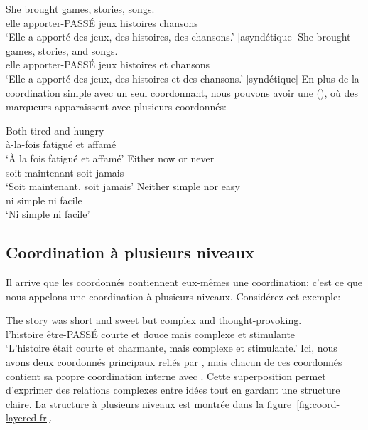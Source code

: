\ea \label{ex:coord-marking-fr}
    \ea \gll She brought {\ob}games{\cb}, {\ob}stories{\cb}, {\ob}songs{\cb}.\\
        elle apporter-PASSÉ jeux histoires chansons\\
    \glt `Elle a apporté des jeux, des histoires, des chansons.' [asyndétique]
    \ex \gll She brought {\ob}games{\cb}, {\ob}stories{\cb}, and {\ob}songs{\cb}.\\
        elle apporter-PASSÉ jeux histoires et chansons\\
    \glt `Elle a apporté des jeux, des histoires et des chansons.' [syndétique]
    \z
\z
En plus de la coordination simple avec un seul coordonnant, nous pouvons avoir une  (), où des marqueurs apparaissent avec plusieurs coordonnés:

\ea \label{ex:coord-correlative-fr}
    \ea \gll {\ob}Both{\cb} tired {\ob}and{\cb} hungry\\
        à-la-fois fatigué et affamé\\
    \glt `À la fois fatigué et affamé'
    \ex \gll {\ob}Either{\cb} now {\ob}or{\cb} never\\
        soit maintenant soit jamais\\
    \glt `Soit maintenant, soit jamais'
    \ex \gll {\ob}Neither{\cb} simple {\ob}nor{\cb} easy\\
        ni simple ni facile\\
    \glt `Ni simple ni facile'
    \z
\z

\subsection{Coordination à plusieurs niveaux}

Il arrive que les coordonnés contiennent eux-mêmes une coordination; c'est ce que nous appelons une coordination à plusieurs niveaux. Considérez cet exemple:

\ea \label{ex:coord-layered-fr}
\gll The story was {\ob}short and sweet{\cb} but {\ob}complex and thought-provoking{\cb}.\\
    l'histoire être-PASSÉ courte et douce mais complexe et stimulante\\
\glt `L'histoire était courte et charmante, mais complexe et stimulante.'
\z
Ici, nous avons deux coordonnés principaux reliés par , mais chacun de ces coordonnés contient sa propre coordination interne avec . Cette superposition permet d'exprimer des relations complexes entre idées tout en gardant une structure claire. La structure à plusieurs niveaux est montrée dans la figure~\ref{fig:coord-layered-fr}.

